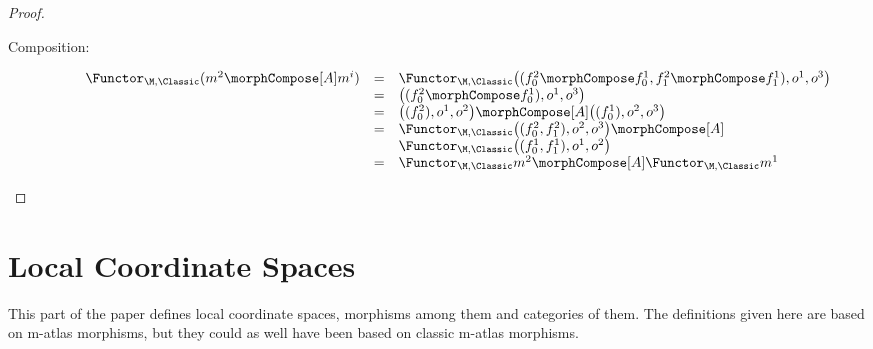 \documentclass{article}
\begin{document}
\begin{theorem}
\begin{proof}
\begin{description}
\item[Composition:]
\begin{equation*}
\begin{array}{lll}
  \Functor_{\M,\Classic} (m^2 \morphCompose[A] m^i)
  & =
  &
  \Functor_{\M,\Classic}
    \bigl (
      (f_0^2 \morphCompose f_0^1, f_1^2 \morphCompose f_1^1),
      o^1,
      o^3
    \bigr )
\\*
  & =
  &
    \bigl (
      (f_0^2 \morphCompose f_0^1),
      o^1,
      o^3
    \bigr )
\\*
  & =
  &
    \bigl (
      (f_0^2),
      o^1,
      o^2
    \bigr )
    \morphCompose[A]
    \bigl (
      (f_0^1),
      o^2,
      o^3
    \bigr )
\\*
  & =
  &
  \Functor_{\M,\Classic}
    \bigl (
      (f_0^2, f_1^2),
      o^2,
      o^3
    \bigr )
  \morphCompose[A]
\\*
  &
  &
    \Functor_{\M,\Classic}
    \bigl (
      (f_0^1, f_1^1),
      o^1,
      o^2
    \bigr )
\\*
  & =
  &
  \Functor_{\M,\Classic} m^2
  \morphCompose[A]
  \Functor_{\M,\Classic} m^1
\end{array}
\end{equation*}
\end{description}
\end{proof}
\end{theorem}

\part{Local Coordinate Spaces}
\label{part:lcs}

This part of the paper defines local coordinate spaces, morphisms among
them and categories of them.  The definitions given here are based on
m-atlas morphisms, but they could as well have been based on classic
m-atlas morphisms.
\end{document}
